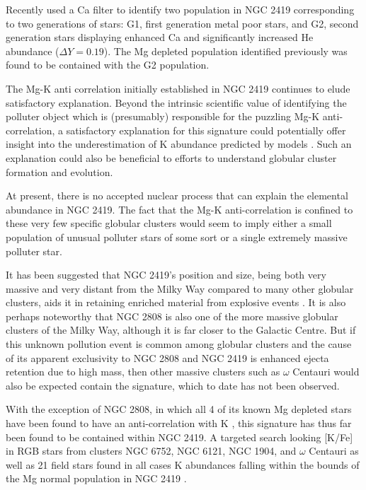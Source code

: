 \documentclass[a4paper,fleqn,usenatbib]{mnras}
\begin{document}
Recently \cite{youngwooklee} used a Ca filter to identify two population in NGC 2419 corresponding to two generations of stars: G1, first generation metal poor stars, and G2, second generation stars displaying enhanced Ca and significantly increased He abundance ($\Delta Y = 0.19$). The Mg depleted population identified previously was found to be contained with the G2 population.


The Mg-K anti correlation initially established in NGC 2419 continues to elude satisfactory explanation. Beyond the intrinsic scientific value of identifying the polluter object which is (presumably) responsible for the puzzling Mg-K anti-correlation, a satisfactory explanation for this signature could potentially offer insight into the underestimation of K abundance predicted by models \citep{kobayashi2011}. Such an explanation could also be beneficial to efforts to understand globular cluster formation and evolution.


At present, there is no accepted nuclear process that can explain the elemental abundance in NGC 2419. The fact that the Mg-K anti-correlation is confined to these very few specific globular clusters would seem to imply either a small population  of unusual polluter stars of some sort or a single extremely massive polluter star.


It has been suggested that NGC 2419's position and size, being both very massive and very distant from the Milky Way compared to many other globular clusters, aids it in retaining enriched material from explosive events \citep{mucciarelli2012}. It is also perhaps noteworthy that NGC 2808 is also one of the more massive globular clusters of the Milky Way, although it is far closer to the Galactic Centre. But if this unknown pollution event is common among globular clusters and the cause of its apparent exclusivity to NGC 2808 and NGC 2419 is enhanced ejecta retention due to high mass, then other massive clusters such as $\omega$ Centauri would also be expected contain the signature, which to date has not been observed.


With the exception of NGC 2808, in which all 4 of its known Mg depleted stars have been found to have an anti-correlation with K \citep{mucciarelli2015}, this signature has thus far been found to be contained within NGC 2419. A  targeted search looking [K/Fe] in RGB stars from clusters NGC 6752, NGC 6121, NGC 1904, and $\omega$ Centauri as well as 21 field stars found in all cases K abundances falling within the bounds of the Mg normal population in NGC 2419 \citep{carretta2013}.
\end{document}
